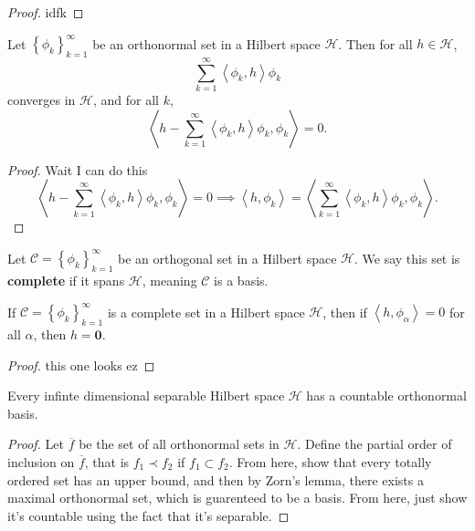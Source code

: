 \documentclass[11pt, letterpaper]{report}
\begin{document}
\begin{proof}
	idfk
\end{proof}
\begin{proposition}\label{prp:2.10}
	Let $\left\{ \phi_k \right\}_{k=1}^\infty$ be an orthonormal set in a Hilbert space $\mathcal{H} $. Then for all $h\in \mathcal{H} $,
	\[
		\sum_{k=1}^{\infty} \left\langle \phi_k,h \right\rangle \phi _k
	\]
	converges in $\mathcal{H} $, and for all $k$,
	\[
		\left\langle h-\sum_{k=1}^{\infty} \left\langle \phi_k,h \right\rangle \phi _k,\phi_k \right\rangle =0
	.\]
\end{proposition}
\begin{proof}
	Wait I can do this
	\[
		\left\langle h-\sum_{k=1}^{\infty} \left\langle \phi_k,h \right\rangle\phi_k ,\phi_k \right\rangle =0 \implies \left\langle h,\phi_k \right\rangle =\left\langle \sum_{k=1}^{\infty} \left\langle \phi_k,h \right\rangle \phi_k,\phi_k \right\rangle 
	.\]
	
\end{proof}
\begin{definition}\label{dfn:2.40}
	Let $\mathcal{C} =\left\{ \phi_k \right\}_{k=1}^\infty$ be an orthogonal set in a Hilbert space $\mathcal{H} $. We say this set is \textbf{complete} if it spans $\mathcal{H} $, meaning $\mathcal{C} $ is a basis.
\end{definition}
\begin{proposition}\label{prp:2.11}
	If $\mathcal{C}=\left\{ \phi_k \right\}_{k=1}^\infty $ is a complete set in a Hilbert space $\mathcal{H} $, then if $\left\langle h,\phi_\alpha  \right\rangle =0$ for all $\alpha$, then $h=\mathbf{0}$.
\end{proposition}
\begin{proof}
	this one looks ez
\end{proof}
\begin{theorem}\label{thm:2.13}
	Every infinte dimensional separable Hilbert space $\mathcal{H} $ has a countable orthonormal basis.
\end{theorem}
\begin{proof}
	Let $\overline{f} $ be the set of all orthonormal sets in $\mathcal{H} $. Define the partial order of inclusion on $\overline{f} $, that is $f_1\prec f_2$ if $f_1\subset f_2$. From here, show that every totally ordered set has an upper bound, and then by Zorn's lemma, there exists a maximal orthonormal set, which is guarenteed to be a basis. From here, just show it's countable using the fact that it's separable.
\end{proof}
\end{document}

